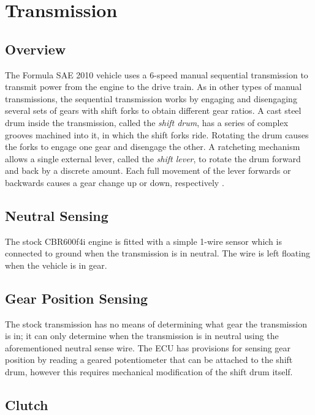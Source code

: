 \section{Transmission}
\label{sec:background_transmission}

\subsection{Overview}

The Formula SAE 2010 vehicle uses a 6-speed manual sequential transmission to transmit power from the engine to the drive train. As in other types of manual transmissions, the sequential transmission works by engaging and disengaging several sets of gears with shift forks to obtain different gear ratios. A cast steel drum inside the transmission, called the \emph{shift drum}, has a series of complex grooves machined into it, in which the shift forks ride. Rotating the drum causes the forks to engage one gear and disengage the other. A ratcheting mechanism allows a single external lever, called the \emph{shift lever}, to rotate the drum forward and back by a discrete amount. Each full movement of the lever forwards or backwards causes a gear change up or down, respectively \cite{HowtoManualTransmission, cbr600}.

\subsection{Neutral Sensing}

The stock CBR600f4i engine is fitted with a simple 1-wire sensor which is connected to ground when the transmission is in neutral. The wire is left floating when the vehicle is in gear.

\subsection{Gear Position Sensing}

The stock transmission has no means of determining what gear the transmission is in; it can only determine when the transmission is in neutral using the aforementioned neutral sense wire. The ECU has provisions for sensing gear position by reading a geared potentiometer that can be attached to the shift drum, however this requires mechanical modification of the shift drum itself.

\subsection{Clutch}

